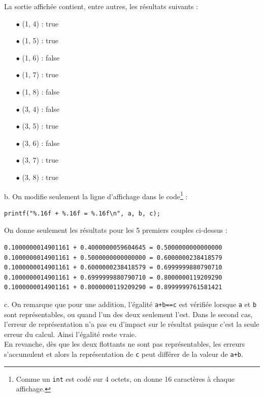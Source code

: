 \documentclass[11pt, a4 paper]{article}
\begin{document}
La sortie affichée contient, entre autres, les résultats suivants :
\begin{multicols}{2}
    \begin{itemize}
        \item[$\bullet$] (1, 4) : true
        \item[$\bullet$] (1, 5) : true
        \item[$\bullet$] (1, 6) : false
        \item[$\bullet$] (1, 7) : true
        \item[$\bullet$] (1, 8) : false
        
        \item[$\bullet$] (3, 4) : false
        \item[$\bullet$] (3, 5) : true
        \item[$\bullet$] (3, 6) : false
        \item[$\bullet$] (3, 7) : true
        \item[$\bullet$] (3, 8) : true
    \end{itemize}    
\end{multicols}

b. On modifie seulement la ligne d'affichage dans le code\footnote{Comme un \texttt{int} est codé sur 4 octets, on donne 16 caractères à chaque affichage.} :
\begin{lstlisting}[style=CStyle]
printf("%.16f + %.16f = %.16f\n", a, b, c);
\end{lstlisting}
On donne seulement les résultats pour les 5 premiers couples ci-dessus :
\begin{lstlisting}[style=CStyle]
0.1000000014901161 + 0.4000000059604645 = 0.5000000000000000
0.1000000014901161 + 0.5000000000000000 = 0.6000000238418579
0.1000000014901161 + 0.6000000238418579 = 0.6999999880790710
0.1000000014901161 + 0.6999999880790710 = 0.8000000119209290
0.1000000014901161 + 0.8000000119209290 = 0.8999999761581421
\end{lstlisting}

c. On remarque que pour une addition, l'égalité \texttt{a+b==c} est vérifiée lorsque \texttt{a} et \texttt{b} sont représentables, ou quand l'un des deux seulement l'est. Dans le second cas, l'erreur de représentation n'a pas eu d'impact sur le résultat puisque c'est la seule erreur du calcul. Ainsi l'égalité reste vraie.\\
En revanche, dès que les deux flottants ne sont pas représentables, les erreurs s'accumulent et alors la représentation de \texttt{c} peut différer de la valeur de \texttt{a+b}.\\
\end{document}
